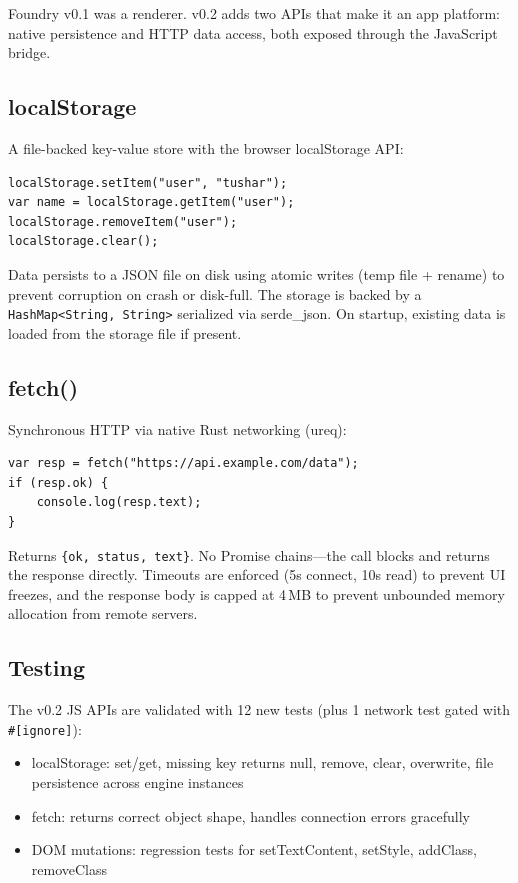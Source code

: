 \documentclass[11pt,twocolumn]{article}
\begin{document}
Foundry v0.1 was a renderer. v0.2 adds two APIs that make it an app platform:
native persistence and HTTP data access, both exposed through the JavaScript bridge.

\subsection{localStorage}

A file-backed key-value store with the browser localStorage API:

\begin{lstlisting}[language={}]
localStorage.setItem("user", "tushar");
var name = localStorage.getItem("user");
localStorage.removeItem("user");
localStorage.clear();
\end{lstlisting}

Data persists to a JSON file on disk using atomic writes (temp file + rename)
to prevent corruption on crash or disk-full. The storage is backed by a
\texttt{HashMap<String, String>} serialized via serde\_json. On startup,
existing data is loaded from the storage file if present.

\subsection{fetch()}

Synchronous HTTP via native Rust networking (ureq):

\begin{lstlisting}[language={}]
var resp = fetch("https://api.example.com/data");
if (resp.ok) {
    console.log(resp.text);
}
\end{lstlisting}

Returns \texttt{\{ok, status, text\}}. No Promise chains---the call blocks
and returns the response directly. Timeouts are enforced (5s connect, 10s read)
to prevent UI freezes, and the response body is capped at 4\,MB to prevent
unbounded memory allocation from remote servers.

\subsection{Testing}

The v0.2 JS APIs are validated with 12 new tests (plus 1 network test
gated with \texttt{\#[ignore]}):

\begin{itemize}
  \item localStorage: set/get, missing key returns null, remove, clear,
    overwrite, file persistence across engine instances
  \item fetch: returns correct object shape, handles connection errors gracefully
  \item DOM mutations: regression tests for setTextContent, setStyle, addClass, removeClass
\end{itemize}
\end{document}
